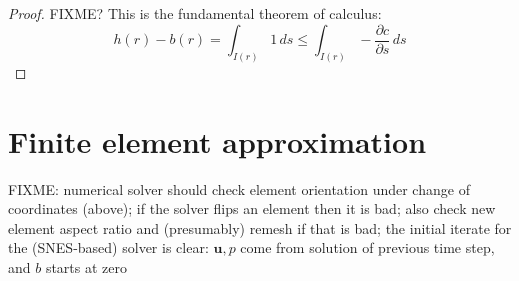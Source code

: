 \documentclass[letterpaper,final,12pt,reqno]{amsart}
\newcommand{\bu}{\mathbf{u}}
\begin{document}
\begin{proof}
FIXME? This is the fundamental theorem of calculus:
    $$h(r) - b(r) = \int_{I(r)} 1\,ds \le \int_{I(r)} - \frac{\partial c}{\partial s}\,ds$$
\end{proof}


\section{Finite element approximation}  \label{sec:finiteelement}

FIXME: numerical solver should check element orientation under change of coordinates (above); if the solver flips an element then it is bad; also check new element aspect ratio and (presumably) remesh if that is bad; the initial iterate for the (SNES-based) solver is clear: $\bu,p$ come from solution of previous time step, and $b$ starts at zero



\small

\bigskip


\end{document}
